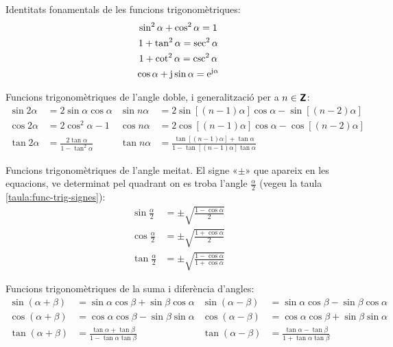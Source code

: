 Identitats fonamentals de les funcions trigonomètriques:
\begin{gather}
    \sin^2\alpha + \cos^2\alpha = 1 \\
    1 + \tan^2\alpha = \sec^2\alpha\\
    1 + \cot^2\alpha = \csc^2\alpha\\
    \cos\alpha + \mathrm{j} \sin\alpha = \mathrm{e}^{\mathrm{j}\alpha}
\end{gather}

Funcions trigonomètriques de l'angle doble, i generalització per a
$n\in{\ensuremath{\boldsymbol{\mathsf{Z}}}}$:
\begin{subequations}
\begin{align}
    \sin 2\alpha &= 2 \sin\alpha \cos\alpha & \sin n \alpha &=
    2\sin[(n-1)\alpha]\cos \alpha -\sin[(n-2)\alpha]\\[1ex]
    \cos 2\alpha &= 2\cos^2\alpha -1 & \cos n\alpha &=
    2\cos[(n-1)\alpha]\cos \alpha -\cos[(n-2)\alpha]\\[1ex]
    \tan 2\alpha &=\frac{2\tan\alpha}{1-\tan^2\alpha} & \tan n
    \alpha &= \frac{\tan[(n-1)\alpha]+\tan\alpha}{1-\tan[(n-1)\alpha]\tan\alpha}
\end{align}
\end{subequations}


Funcions trigonomètriques de l'angle meitat. El signe «$\pm$» que
apareix en les equacions, ve determinat pel quadrant on es troba
l'angle $\frac{\alpha}{2}$ (vegeu la taula
\vref{taula:func-trig-signes}):
\begin{subequations}
\begin{align}
    \sin \frac{\alpha}{2} &= \pm \sqrt{\frac{1-\cos\alpha}{2}}\\[1ex]
    \cos \frac{\alpha}{2} &= \pm \sqrt{\frac{1+\cos\alpha}{2}}\\[1ex]
    \tan \frac{\alpha}{2} &= \pm \sqrt{\frac{1-\cos\alpha}{1+\cos\alpha}}
\end{align}
\end{subequations}


Funcions trigonomètriques de la suma i diferència d'angles:
\begin{subequations}
\begin{align}
    \sin(\alpha+\beta) &= \sin\alpha \cos\beta + \sin\beta\cos\alpha &
    \sin(\alpha-\beta) &= \sin\alpha \cos\beta - \sin\beta\cos\alpha\\[1ex]
    \cos(\alpha+\beta) &= \cos\alpha \cos\beta - \sin\beta\sin\alpha &
    \cos(\alpha-\beta) &= \cos\alpha \cos\beta + \sin\beta\sin\alpha\label{eq:D13b}\\[1ex]
    \tan(\alpha+\beta) &=\frac{\tan\alpha+\tan\beta}{1-\tan\alpha\tan\beta} &
    \tan(\alpha-\beta)
    &=\frac{\tan\alpha-\tan\beta}{1+\tan\alpha\tan\beta}
\end{align}
\end{subequations}

